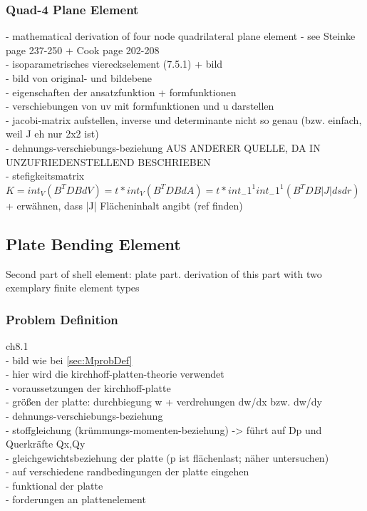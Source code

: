 \documentclass[11pt,twoside]{scrartcl}
\begin{document}
  \subsubsection{Quad-4 Plane Element}
  - mathematical derivation of four node quadrilateral plane element\newline
  - see Steinke \cite{steinke2005finite} page 237-250 + Cook \cite{cook2002concepts} page 202-208\\
  - isoparametrisches viereckselement (7.5.1) + bild\\
  - bild von original- und bildebene\\
  - eigenschaften der ansatzfunktion + formfunktionen\\
  - verschiebungen von uv mit formfunktionen und u darstellen\\
  - jacobi-matrix aufstellen, inverse und determinante nicht so genau (bzw. einfach, weil J eh nur 2x2 ist)\\
  - dehnungs-verschiebungs-beziehung AUS ANDERER QUELLE, DA IN \cite{steinke2005finite} UNZUFRIEDENSTELLEND BESCHRIEBEN\\
  - stefigkeitsmatrix $K = int_V(B^TDBdV) = t*int_V(B^TDBdA) = t*int_-1^1 int_-1^1(B^TDB|J|dsdr)$ + erwähnen, dass |J| Flächeninhalt angibt (ref finden)
 \subsection{Plate Bending Element}
 Second part of shell element: plate part. derivation of this part with two exemplary finite element types
  \subsubsection{Problem Definition}
  \cite{steinke2005finite} ch8.1\\
  - bild wie bei \ref{sec:MprobDef}\\
  - hier wird die kirchhoff-platten-theorie verwendet\\
  - voraussetzungen der kirchhoff-platte\\
  - größen der platte: durchbiegung w + verdrehungen dw/dx bzw. dw/dy\\
  - dehnungs-verschiebungs-beziehung\\
  - stoffgleichung (krümmungs-momenten-beziehung) -> führt auf Dp und Querkräfte Qx,Qy\\
  - gleichgewichtsbeziehung der platte (p ist flächenlast; näher untersuchen)\\
  - auf verschiedene randbedingungen der platte eingehen\\
  - funktional der platte\\
  - forderungen an plattenelement
\end{document}
